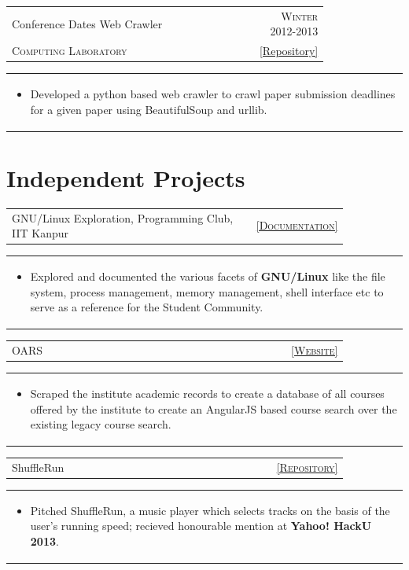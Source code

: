 \documentclass[a4paper]{article} %
\newcommand{\cproject}[5]{
    \begin{tabular}{p{0.80\linewidth}r}
        \textcolor{NavyBlue}{\small #2} & \multicolumn{1}{m{4cm}}{\raggedleft \small {\textsc{#1}}}\\
        \small {#3} & \small {#4}
    \end{tabular}
    \begin{tabular}{p{\linewidth}}
    \vspace{-0.3cm}
        \footnotesize {#5}
    \end{tabular}
    \vspace{-0.5cm}
}
\newcommand{\iproject}[3]{
    \begin{tabular}{p{0.85\linewidth}r}
        \textcolor{NavyBlue}{\small #2} & \multicolumn{1}{m{3cm}}{\raggedleft \small {\textsc{#1}}}\\
    \end{tabular}
    \begin{tabular}{p{\linewidth}}
    \vspace{-0.3cm}
        \footnotesize{#3}
    \end{tabular}
    \vspace{-0.6cm}
}
\begin{document}
\cproject
    {Winter 2012-2013}
    {Conference Dates Web Crawler}
    {\textsc{Computing Laboratory}}
    {\href{https://github.com/srijanshetty/crawler} { [Repository] } }
    {
      \begin{itemize}[leftmargin=0.5cm]
           \item Developed a python based web crawler to crawl paper submission deadlines for a given paper using BeautifulSoup and
           urllib.
      \end{itemize}
    }

\section{Independent Projects}

\iproject
    {\href{https://docs.google.com/document/d/1ZHO9w36aoq3oaZBR4Um1AOmDfiTDAEgM6baQAu3icw4/edit?usp=sharing}{\small [Documentation]} }
    {GNU/Linux Exploration, Programming Club, IIT Kanpur}
    {
      \begin{itemize}[leftmargin=0.5cm]
            \item Explored and documented the various facets of \textbf{GNU/Linux} like the file system,
              process management, memory management, shell interface etc to serve as a reference for the
              Student Community.
      \end{itemize}
    }

\iproject
    {\href{https://navya.github.io/oars}{\small [Website]}}
    {OARS}
    {
        \begin{itemize}[leftmargin=0.5cm]
            \item Scraped the institute academic records to create a database of all courses offered by the
                institute to create an AngularJS based course search over the existing legacy course search.
        \end{itemize}
    }

\iproject
    {\href{https://github.com/srijanshetty/ShuffleRun} {\small [Repository]}}
    {ShuffleRun}
    {
        \begin{itemize}[leftmargin=0.5cm]
            \item Pitched ShuffleRun, a music player which selects tracks on the basis of the user's running speed;
                recieved honourable mention at \textbf{Yahoo! HackU 2013}.
        \end{itemize}
    }
\end{document}
